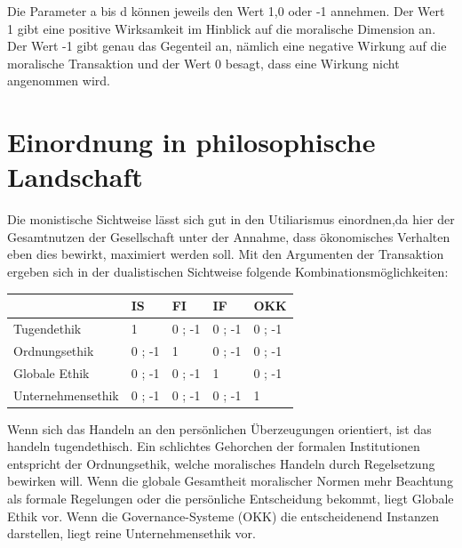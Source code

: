 \documentclass[12pt]{article}
\begin{document}
Die Parameter a bis d können jeweils den Wert 1,0 oder -1 annehmen. Der Wert 1 gibt eine positive Wirksamkeit im Hinblick auf die moralische Dimension an. Der Wert -1 gibt genau das Gegenteil an, nämlich eine negative Wirkung auf die moralische Transaktion und der Wert 0 besagt, dass eine Wirkung nicht angenommen wird.
\section{Einordnung in philosophische Landschaft}
Die monistische Sichtweise lässt sich gut in den Utiliarismus einordnen,da hier der Gesamtnutzen der Gesellschaft unter der Annahme, dass ökonomisches Verhalten eben dies bewirkt, maximiert werden soll. Mit den Argumenten der Transaktion ergeben sich in der dualistischen Sichtweise folgende Kombinationsmöglichkeiten:
\begin{center}
\begin{tabular}{|p{4cm}|p{2cm}|p{2cm}|p{2cm}|p{2cm}|}
\hline
 { } & IS & FI & IF & OKK\\\hline
 Tugendethik & 1 & 0 ; -1 & 0 ; -1 & 0 ; -1\\\hline
 Ordnungsethik & 0 ; -1 & 1 & 0 ; -1 & 0 ; -1\\\hline
 Globale Ethik & 0 ; -1 & 0 ; -1 & 1 & 0 ; -1\\\hline
 Unternehmensethik & 0 ; -1 & 0 ; -1 & 0 ; -1 & 1\\\hline
\end{tabular}
\end{center}
Wenn sich das Handeln an den persönlichen Überzeugungen orientiert, ist das handeln tugendethisch. Ein schlichtes Gehorchen der formalen Institutionen entspricht der Ordnungsethik, welche moralisches Handeln durch Regelsetzung bewirken will. Wenn die globale Gesamtheit moralischer Normen mehr Beachtung als formale Regelungen oder die persönliche Entscheidung bekommt, liegt Globale Ethik vor. Wenn die Governance-Systeme (OKK) die entscheidenend Instanzen darstellen, liegt reine Unternehmensethik vor.\\
\\
\end{document}
